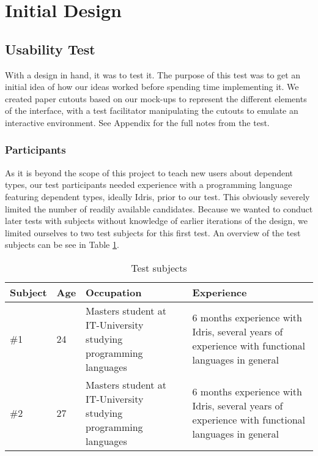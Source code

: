 \section{Initial Design}
\label{sec:InitialDesign}







\subsection{Usability Test}
\label{sec:UsabilityTest}
With a design in hand, it was to test it. The purpose of this test was to get
an initial idea of how our ideas worked before spending time implementing it.
We created paper cutouts based on our mock-ups to represent the different
elements of the interface, with a test facilitator manipulating the cutouts to
emulate an interactive environment. See Appendix  for the full notes
from the test.

\subsubsection{Participants}
As it is beyond the scope of this project to teach new users about dependent
types, our test participants needed experience with a programming language
featuring dependent types, ideally Idris, prior to our test. This obviously
severely limited the number of readily available candidates. Because we wanted
to conduct later tests with subjects without knowledge of earlier iterations of
the design, we limited ourselves to two test subjects for this first test. An
overview of the test subjects can be see in Table \ref{table:first_test_subjects}.

\begin{table}[h]
\centering
\begin{tabular}{| l | l | p{5cm} | p{5cm} |}
\hline
Subject & Age & Occupation & Experience \\ \hline
\#1 & 24 & Masters student at IT-University studying programming languages & 6 months experience with Idris, several years of experience with functional languages in general \\ \hline
\#2 & 27 & Masters student at IT-University studying programming languages & 6 months experience with Idris, several years of experience with functional languages in general \\ \hline
\end{tabular}
\caption {Test subjects}
\label{table:first_test_subjects}
\end{table}

